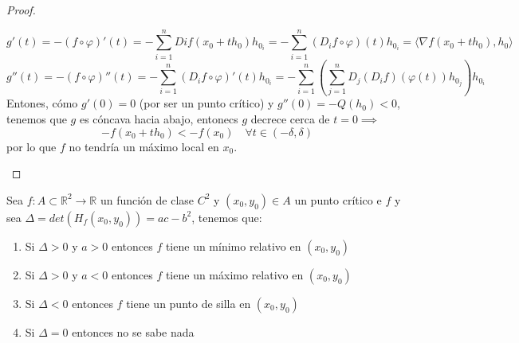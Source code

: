 \begin{proof}
\begin{enumerate}
        $$g'(t) = - (f \circ \varphi)'(t) = -\sum_{i = 1}^{n} D{i}f(x_0 + th_0)h_{0_i} = - \sum_{i = 1}^{n} (D_if \circ \varphi)(t)h_{0_i} = \langle \nabla f(x_0 + th_0), h_0 \rangle$$
        $$g''(t) = - (f \circ \varphi)''(t) = - \sum_{i = 1}^{n} (D_if \circ \varphi)'(t)h_{0_i} = - \sum_{i = 1}^{n} \left(\sum_{j = 1}^{n} D_{j}(D_{i}f)(\varphi(t))h_{0_j}\right)h_{0_i}$$
        Entones, cómo $g'(0) = 0$ (por ser un punto crítico) y $g''(0) = -Q(h_0) < 0$, tenemos que $g$ es cóncava hacia abajo, entonecs $g$ decrece cerca de $t = 0 \implies$
        $$-f(x_0 + th_0) < -f(x_0) \quad \forall t \in (-\delta, \delta)$$
        por lo que $f$ no tendría un máximo local en $x_0$. 
    \end{enumerate}
\end{proof}

\begin{teorema}
    Sea $f: A \subset \mathbb{R}^2 \to \mathbb{R}$ un función de clase $C^2$ y $(x_0, y_0) \in A$ un punto crítico e $f$ y sea $\Delta = det(H_{f}(x_0, y_0)) = ac - b^2$, tenemos que: 
    \begin{enumerate}
        \item Si $\Delta > 0$ y $a > 0$ entonces $f$ tiene un mínimo relativo en $(x_0, y_0)$
        \item Si $\Delta > 0$ y $ a < 0$ entonces $f$ tiene un máximo relativo en $(x_0, y_0)$
        \item Si $\Delta < 0$ entonces $f$ tiene un punto de silla en $(x_0, y_0)$
        \item Si $\Delta = 0$ entonces no se sabe nada
    \end{enumerate}
\end{teorema}
